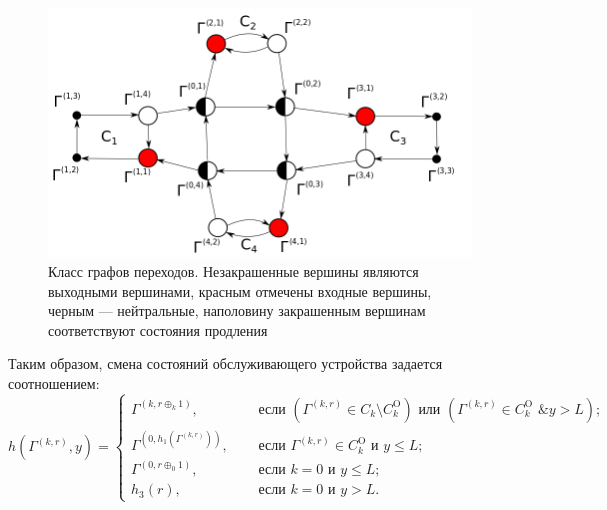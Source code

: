 \documentclass[a4paper,12pt,russian]{extarticle}
\begin{document}
\begin{figure}[h]\centering
\includegraphics[scale=0.5]{GraphScheme3.png} 
\caption{Класс графов переходов. Незакрашенные вершины являются выходными вершинами, красным отмечены входные вершины, черным --- нейтральные, наполовину закрашенным вершинам соответствуют состояния продления}
\label{GraphScheme}
\end{figure}

Таким образом, смена состояний обслуживающего устройства задается соотношением:
\begin{equation}
h(\Gamma^{(k,r)},y) = 
\begin{cases}
\Gamma^{(k,r \oplus_k 1)},& \quad \text{ если } (\Gamma^{(k,r)}\in C_k\setminus C_k^{\mathrm{O}}) \text{ или } (\Gamma^{(k,r)}\in C_k^{\mathrm{O}} \text{ \& } y>L);\\
\Gamma^{(0,h_1(\Gamma^{(k,r)}))},& \quad \text{ если } \Gamma^{(k,r)}\in C_k^{\mathrm{O}} \text{ и } y\leqslant L;\\
\Gamma^{(0,r \oplus_0 1)},& \quad \text{ если } k=0 \text{ и } y\leqslant L;\\
h_3(r),& \quad \text{ если } k=0 \text{ и } y > L.
\end{cases}
\label{hLaw}
\end{equation}
\end{document}
